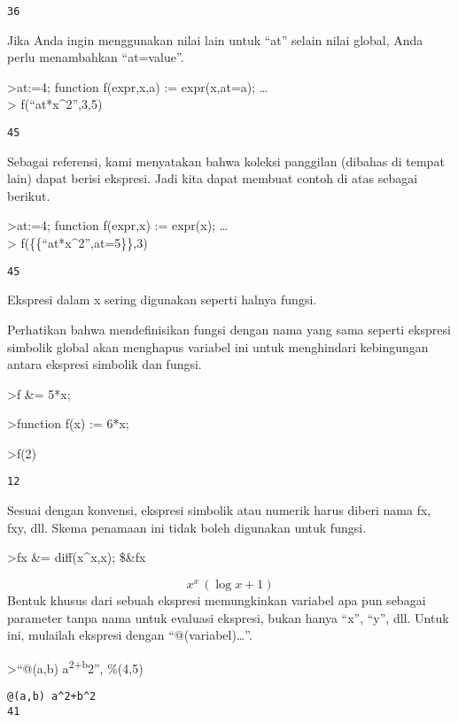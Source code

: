 \documentclass[
]{book}
\begin{document}
\begin{verbatim}
36
\end{verbatim}

Jika Anda ingin menggunakan nilai lain untuk ``at'' selain nilai global, Anda perlu menambahkan ``at=value''.

\textgreater at:=4; function f(expr,x,a) := expr(x,at=a); \ldots{}\\
\textgreater{} f(``at*x\^{}2'',3,5)

\begin{verbatim}
45
\end{verbatim}

Sebagai referensi, kami menyatakan bahwa koleksi panggilan (dibahas di tempat lain) dapat berisi ekspresi. Jadi kita dapat membuat contoh di atas sebagai berikut.

\textgreater at:=4; function f(expr,x) := expr(x); \ldots{}\\
\textgreater{} f(\{\{``at*x\^{}2'',at=5\}\},3)

\begin{verbatim}
45
\end{verbatim}

Ekspresi dalam x sering digunakan seperti halnya fungsi.

Perhatikan bahwa mendefinisikan fungsi dengan nama yang sama seperti ekspresi simbolik global akan menghapus variabel ini untuk menghindari kebingungan antara ekspresi simbolik dan fungsi.

\textgreater f \&= 5*x;

\textgreater function f(x) := 6*x;

\textgreater f(2)

\begin{verbatim}
12
\end{verbatim}

Sesuai dengan konvensi, ekspresi simbolik atau numerik harus diberi nama fx, fxy, dll. Skema penamaan ini tidak boleh digunakan untuk fungsi.

\textgreater fx \&= diff(x\^{}x,x); \$\&fx

\[x^{x}\,\left(\log x+1\right)\]Bentuk khusus dari sebuah ekspresi memungkinkan variabel apa pun sebagai parameter tanpa nama untuk evaluasi ekspresi, bukan hanya ``x'', ``y'', dll. Untuk ini, mulailah ekspresi dengan ``@(variabel)\ldots{}''.

\textgreater{}``@(a,b) a\textsuperscript{2+b}2'', \%(4,5)

\begin{verbatim}
@(a,b) a^2+b^2
41
\end{verbatim}
\end{document}
